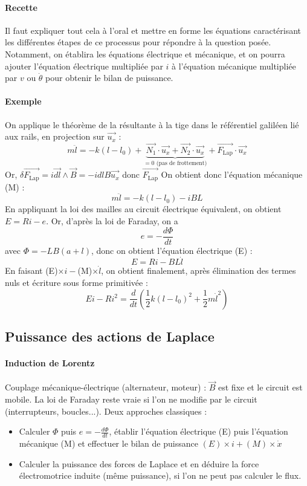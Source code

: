 \documentclass[french]{book}
\theoremstyle{plain}
\theoremstyle{definition}
\theoremstyle{remark}
\begin{document}
\paragraph{Recette}Il faut expliquer tout cela à l'oral et mettre en forme les équations caractérisant les différentes étapes de ce processus pour répondre à la question posée. Notamment, on établira les équations électrique et mécanique, et on pourra ajouter l'équation électrique multipliée par $i$ à l'équation mécanique multipliée par $v$ ou $\dot{\theta}$ pour obtenir le bilan de puissance.
\paragraph{Exemple}
On applique le théorème de la résultante à la tige dans le référentiel galiléen lié aux rails, en projection sur $\overrightarrow{u_x}$ : $$m\ddot{l}=-k(l-l_0)+\underbrace{\overrightarrow{N_1}\cdot\overrightarrow{u_x}+\overrightarrow{N_2}\cdot\overrightarrow{u_x}}_{=0\text{ (pas de frottement)}}+\overrightarrow{F_\text{Lap}}\cdot\overrightarrow{u_x}$$ Or, $\delta\overrightarrow{F_\text{Lap}}=i\overrightarrow{dl}\wedge\overrightarrow{B}=-idlB\overrightarrow{u_x}$ donc $\overrightarrow{F_\text{Lap}}$ On obtient donc l'équation mécanique (M) : $$m\ddot{l}=-k(l-l_0)-iBL$$
En appliquant la loi des mailles au circuit électrique équivalent, on obtient $E=Ri-e$. Or, d'après la loi de Faraday, on a $$e=-\frac{d\Phi}{dt}$$ avec $\Phi=-LB(a+l)$, donc on obtient l'équation électrique (E) : $$E=Ri-BL\dot{l}$$ En faisant (E)$\times i-$(M)$\times\dot{l}$, on obtient finalement, après élimination des termes nuls et écriture sous forme primitivée : $$Ei-Ri^2=\frac{d}{dt}\left(\frac{1}{2}k(l-l_0)^2+\frac{1}{2}m\dot{l}^2\right)$$
\subsection{Puissance des actions de Laplace}
\paragraph{Induction de Lorentz} Couplage mécanique-électrique (alternateur, moteur) : $\overrightarrow{B}$ est fixe et le circuit est mobile. La loi de Faraday reste vraie si l’on ne modifie par le circuit (interrupteurs, boucles...). Deux approches classiques :
\begin{itemize}
	\item Calculer $\Phi$ puis $\displaystyle e=-\frac{d\Phi}{dt}$, établir l’équation électrique (E) puis l’équation mécanique (M) et effectuer le bilan de puissance $(E)\times i+(M)\times\dot{x}$
	\item Calculer la puissance des forces de Laplace et en déduire la force électromotrice induite (même puissance), si l’on ne peut pas calculer le flux.
\end{itemize}
\end{document}
